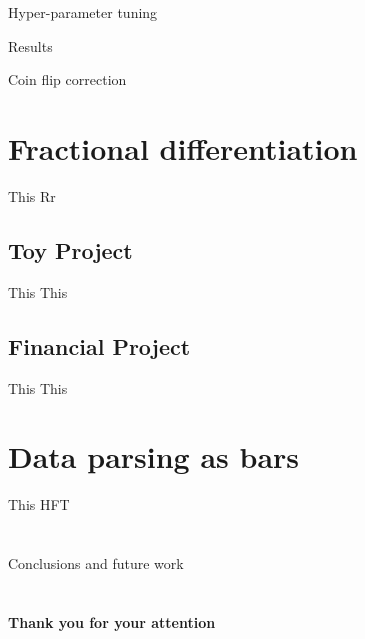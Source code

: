 \documentclass{beamer} %
\begin{document}
\begin{frame}{Hyper-parameter tuning}

\end{frame}

\begin{frame}{Results}

\end{frame}

\begin{frame}{Coin flip correction}

\end{frame}

\section{Fractional differentiation}
\begin{frame}{This}
	Rr
\end{frame}

\subsection{Toy Project}
\begin{frame}{This}
	This
\end{frame}

\subsection{Financial Project}
\begin{frame}{This}
	This
\end{frame}


\section{Data parsing as bars}
\begin{frame}{This}
	HFT
\end{frame}

\section{}
\begin{frame}{Conclusions and future work}

\end{frame}

\section{}
\begin{frame}
	\Large
	\begin{center}
		\textbf{Thank you for your attention}
	\end{center}

\end{frame}
\end{document}
